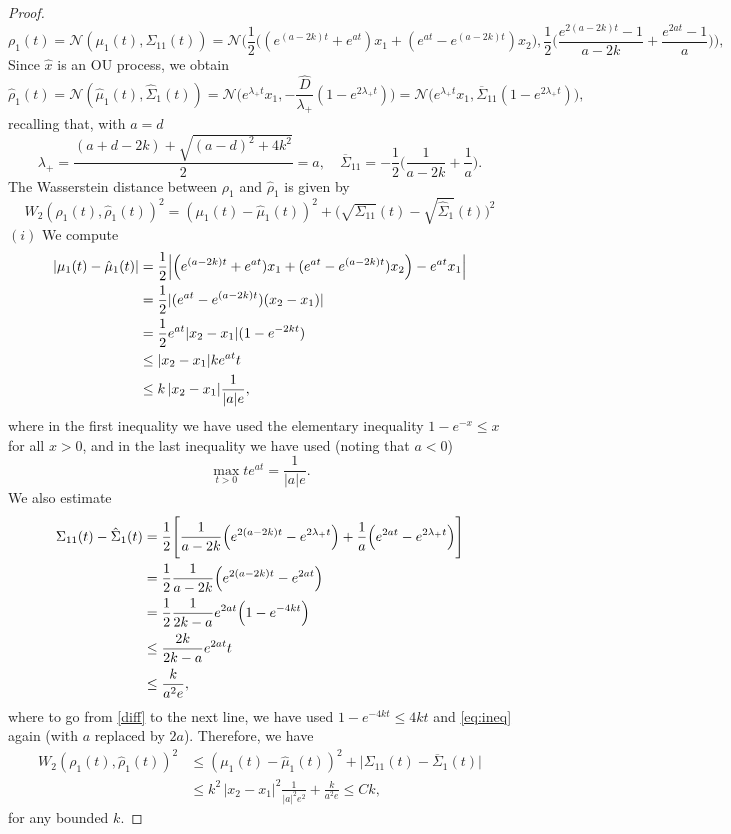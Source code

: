\documentclass[a4paper,twoside]{article}      %
\theoremstyle{definition}
\begin{document}
\begin{proof}
$$
\rho_1(t)=\mathcal{N}(\mu_1(t),\Sigma_{11}(t))=\mathcal{N}\Bigg(\frac{1}{2}\Big((e^{(a-2k)t}+e^{at})x_1+( e^{at} -e^{(a-2k)t})x_2\Big),\frac{1}{2}\Big(
 \frac{e^{2(a-2k)t}-1}{a-2k}+\frac{e^{2at}-1}{a}\Big)\Bigg),
$$
Since $\hat{x}$ is an OU process, we obtain
$$
\hat{\rho}_1(t)=\mathcal{N}(\hat{\mu}_1(t),\hat{\Sigma}_{1}(t))=\mathcal{N}\Big(e^{\lambda_+ t}x_1,-\frac{\hat{D}}{\lambda_+}(1-e^{2\lambda_+ t})\Big)=\mathcal{N}\Big(e^{\lambda_+ t}x_1,\overline{\Sigma}_{11}(1-e^{2\lambda_+ t})\Big),
$$
recalling that, with $a=d$
$$
\lambda_+=\frac{(a+d-2k)+\sqrt{(a-d)^2+4k^2}}{2}=a,\quad \overline{\Sigma}_{11}=-\frac{1}{2}\Big(\frac{1}{a-2k}+\frac{1}{a}\Big).
$$
The Wasserstein distance between $\rho_1$ and $\hat{\rho}_1$ is given by
\begin{equation}
    W_2(\rho_1(t),\hat{\rho}_1(t))^2=(\mu_1(t)-\hat{\mu}_1(t))^2+\Big(\sqrt{\Sigma_{11}}(t)-\sqrt{\hat{\Sigma}_{1}}(t)\Big)^2
\end{equation}
$(i)$ We compute
\begin{align}
|\mu_1(t)-\hat{\mu}_1(t)|&=\frac{1}{2}\Big|\Big(e^{(a-2k)t}+e^{at})x_1+( e^{at} -e^{(a-2k)t})x_2\Big)-e^{at}x_1\Big|\notag
\\&=\frac{1}{2}|(e^{at}-e^{(a-2k)t})(x_2-x_1)|\notag
 \\&=  \frac{1}{2}e^{at}|x_2-x_1|(1-e^{-2kt})\label{mean}
 \\& \leq |x_2-x_1|k e^{at}t \notag
 \\& \leq k\,|x_2-x_1| \frac{1}{|a| e},\notag
\end{align}
where in the first inequality we have used the elementary inequality $1-e^{-x}\leq x$ for all $x>0$, and in the last inequality we have used (noting that $a<0$)
\begin{equation}
\label{eq:ineq}
\max_{t>0}t e^{at}=\frac{1}{|a| e}.
\end{equation}
We also estimate
\begin{align}
\Sigma_{11}(t)-\hat{\Sigma}_{1}(t)&=\frac{1}{2}\Bigg[\frac{1}{a-2k}\Big(e^{2(a-2k)t}-e^{2\lambda_+ t}\Big)+\frac{1}{a}\Big(e^{2at}-e^{2\lambda_+ t}\Big)\Bigg]\notag
\\&=\frac{1}{2}\frac{1}{a-2k}\Big(e^{2(a-2k)t}-e^{2a t}\Big)\notag
\\&=\frac{1}{2}\frac{1}{2k-a}e^{2at}\Big(1-e^{-4kt}\Big)\label{diff}
\\&\leq \frac{2k}{2k-a}e^{2at}t\notag
\\& \leq \frac{k}{a^2 e},\notag
\end{align}
where to go from \eqref{diff} to the next line, we have used $1-e^{-4kt}\leq 4kt$ and \eqref{eq:ineq} again (with $a$ replaced by $2a$).
Therefore, we have
\begin{align*}
   W_2(\rho_1(t),\hat{\rho}_1(t))^2&\leq (\mu_1(t)-\hat{\mu}_1(t))^2+\Big|\Sigma_{11}(t)-\overline{\Sigma}_{1}(t)\Big| 
   \\& \leq  k^2\,|x_2-x_1|^2 \frac{1}{|a|^2 e^2}+ \frac{k}{a^2 e}
   \leq C k,
\end{align*}
for any bounded $k$. 


\end{proof}
\end{document}
